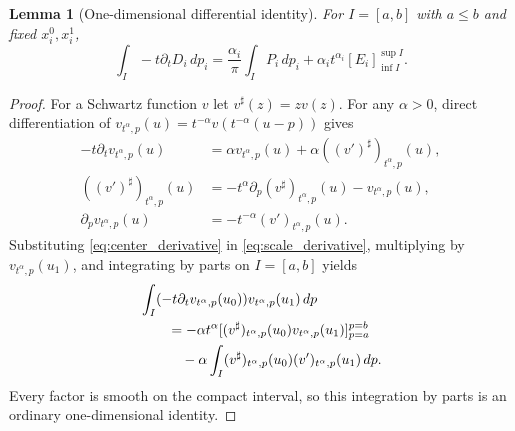 \documentclass[12pt,reqno]{amsart}
\theoremstyle{plain}
\newtheorem{lemma}[theorem]{Lemma}
\theoremstyle{definition}
\theoremstyle{remark}
\numberwithin{equation}{section}
\newcommand{\dd}{\,d}
\begin{document}
\begin{lemma}[One-dimensional differential identity]\label{lem:oned_telescoping}
For $I=[a,b]$ with $a\le b$ and fixed $x_i^0,x_i^1$,
\begin{equation}\label{eq:oned_telescoping}
 \int_I-t\partial_tD_i\dd p_i
 =\frac{\alpha_i}{\pi}\int_IP_i\dd p_i
                  +\alpha_i t^{\alpha_i}[E_i]_{\inf I}^{\sup I}.
\end{equation}
\end{lemma}
\begin{proof}
For a Schwartz function $v$ let $v^\sharp(z)=zv(z)$. For any
$\alpha>0$, direct differentiation of
$v_{t^\alpha,p}(u)=t^{-\alpha}v(t^{-\alpha}(u-p))$ gives
\begin{align}
 -t\partial_tv_{t^\alpha,p}(u)
   &=\alpha v_{t^\alpha,p}(u)
       +\alpha((v')^\sharp)_{t^\alpha,p}(u),\label{eq:scale_derivative}\\
 ((v')^\sharp)_{t^\alpha,p}(u)
   &=-t^\alpha\partial_p(v^\sharp)_{t^\alpha,p}(u)
       -v_{t^\alpha,p}(u),\label{eq:center_derivative}\\
 \partial_pv_{t^\alpha,p}(u)&=-t^{-\alpha}(v')_{t^\alpha,p}(u).
                                                        \label{eq:center_derivative_v}
\end{align}
Substituting \eqref{eq:center_derivative} in
\eqref{eq:scale_derivative}, multiplying by
$v_{t^\alpha,p}(u_1)$, and integrating by parts on $I=[a,b]$ yields
\begin{align}
 &\int_I(-t\partial_tv_{t^\alpha,p}(u_0))v_{t^\alpha,p}(u_1)\dd p\notag\\
 &\qquad=-\alpha t^\alpha[(v^\sharp)_{t^\alpha,p}(u_0)
                       v_{t^\alpha,p}(u_1)]_{p=a}^{p=b}\notag\\
 &\qquad\quad-\alpha\int_I(v^\sharp)_{t^\alpha,p}(u_0)
                       (v')_{t^\alpha,p}(u_1)\dd p.
                                             \label{eq:scale_ibp}
\end{align}
Every factor is smooth on the compact interval, so this integration
by parts is an ordinary one-dimensional identity.


\end{proof}
\end{document}
